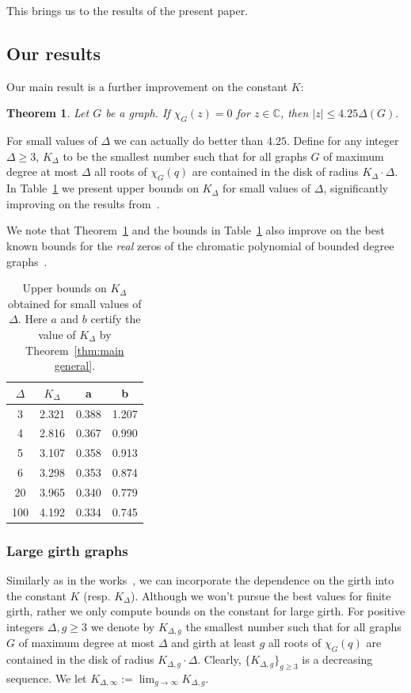 \documentclass[a4paper,11pt,reqno]{amsart}
\newtheorem{theorem}[corollary]{Theorem}
\numberwithin{equation}{section}
\begin{document}
This brings us to the results of the present paper.
\subsection*{Our results}
Our main result is a further improvement on the constant $K$:
\begin{theorem}\label{thm:main}
Let $G$ be a graph. If $\chi_G(z)=0$ for $z\in \mathbb{C}$, then $|z|\leq 4.25 \Delta(G).$
\end{theorem}
For small values of $\Delta$ we can actually do better than $4.25$.
Define for any integer $\Delta\geq 3$, $K_\Delta$ to be the smallest number such that for all graphs $G$ of maximum degree at most $\Delta$ all roots of $\chi_G(q)$ are contained in the disk of radius $K_{\Delta}\cdot \Delta$.
In Table~\ref{tab:main general} we present upper bounds on $K_\Delta$ for small values of $\Delta$, significantly improving on the results from~\cite{procacci2024zero}. 

We note that Theorem~\ref{thm:main} and the bounds in Table~\ref{tab:main general} also improve on the best known bounds for the \emph{real} zeros of the chromatic polynomial of bounded degree graphs~\cite{Dongrealzeros}.

\begin{table}[h]
    \centering
    \begin{tabular}{c|c|c|c}
        $\Delta$ & $K_\Delta$ & a & b \\
        \hline
        3  &  2.321  &  0.388  &  1.207 \\
        4  &  2.816  &  0.367  &  0.990 \\
        5  &  3.107  &  0.358  &  0.913 \\
        6  &  3.298  &  0.353  &  0.874 \\
        20  &  3.965  &  0.340  &  0.779 \\
        100  &  4.192  &  0.334  &  0.745
    \end{tabular}
    \caption{Upper bounds on $K_\Delta$ obtained for small values of $\Delta$. Here $a$ and $b$ certify the value of $K_\Delta$ by Theorem~\ref{thm:main general}.}
    \label{tab:main general}
\end{table}
\subsubsection*{Large girth graphs}
Similarly as in the works~\cites{JPR24,procacci2024zero}, we can incorporate the dependence on the girth into the constant $K$ (resp. $K_\Delta$). Although we won't pursue the best values for finite girth, rather we only compute bounds on the constant for large girth.
For positive integers $\Delta,g\geq 3$ we denote by $K_{\Delta,g}$ the smallest number such that for all graphs $G$ of maximum degree at most $\Delta$ and girth at least $g$ all roots of $\chi_{G}(q)$ are contained in the disk of radius $K_{\Delta,g}\cdot \Delta$.
Clearly, $\{K_{\Delta,g}\}_{g\geq 3}$ is a decreasing sequence. We let $K_{\Delta,\infty}:=\lim_{g\to \infty}K_{\Delta,g}$. 
\end{document}
